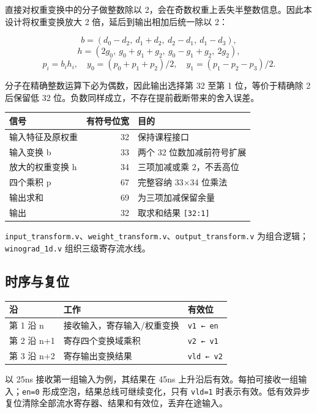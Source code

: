 \documentclass[
  10pt,
  a4paper,
]{article}
\begin{document}
直接对权重变换中的分子做整数除以
2，会在奇数权重上丢失半整数信息。因此本设计将权重变换放大 2
倍，延后到输出相加后统一除以 2：

\[b=(d_0-d_2,\ d_1+d_2,\ d_2-d_1,\ d_1-d_3),\]
\[h=(2g_0,\ g_0+g_1+g_2,\ g_0-g_1+g_2,\ 2g_2),\]
\[p_i=b_i h_i,\quad y_0=(p_0+p_1+p_2)/2,\quad y_1=(p_1-p_2-p_3)/2.\]

分子在精确整数运算下必为偶数，因此输出选择第 32 至第 1 位，等价于精确除
2 后保留低 32 位。负数同样成立，不存在提前截断带来的舍入误差。

\begin{longtable}[]{@{}lrl@{}}
\toprule\noalign{}
信号 & 有符号位宽 & 目的 \\
\midrule\noalign{}
\endhead
\bottomrule\noalign{}
\endlastfoot
输入特征及原权重 & 32 & 保持课程接口 \\
输入变换 b & 33 & 两个 32 位数加减前符号扩展 \\
放大的权重变换 h & 34 & 三项加减或乘 2，不丢高位 \\
四个乘积 p & 67 & 完整容纳 33×34 位乘法 \\
输出求和 & 69 & 为三项加减保留余量 \\
输出 & 32 & 取求和结果 \texttt{{[}32:1{]}} \\
\end{longtable}

\texttt{input\_transform.v}、\texttt{weight\_transform.v}、\texttt{output\_transform.v}
为组合逻辑；\texttt{winograd\_1d.v} 组织三级寄存流水线。

\subsection{时序与复位}\label{ux65f6ux5e8fux4e0eux590dux4f4d}

\begin{longtable}[]{@{}lll@{}}
\toprule\noalign{}
沿 & 工作 & 有效位 \\
\midrule\noalign{}
\endhead
\bottomrule\noalign{}
\endlastfoot
第 1 沿 n & 接收输入，寄存输入/权重变换 & \texttt{v1\ ←\ en} \\
第 2 沿 n+1 & 寄存四个变换域乘积 & \texttt{v2\ ←\ v1} \\
第 3 沿 n+2 & 寄存输出变换结果 & \texttt{vld\ ←\ v2} \\
\end{longtable}

以 25ns 接收第一组输入为例，其结果在 45ns
上升沿后有效。每拍可接收一组输入；\texttt{en=0}
形成空泡，结果总线可继续变化，只有 \texttt{vld=1}
时表示有效。低有效异步复位清除全部流水寄存器、结果和有效位，丢弃在途输入。
\end{document}
